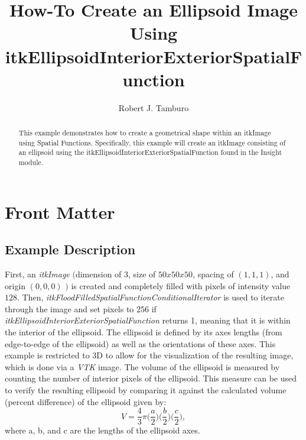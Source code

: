 \documentclass{InsightHowto}
\title{How-To Create an Ellipsoid Image Using itkEllipsoidInteriorExteriorSpatialFunction}
\author{Robert J. Tamburo}
\begin{document}
\maketitle

%


\ifhtml
\chapter*{Front Matter\label{front}}
\fi

\begin{abstract}
\noindent This example demonstrates how to create a geometrical shape within an itkImage
using Spatial Functions. Specifically, this example will create an itkImage consisting of an
ellipsoid using the itkEllipsoidInteriorExteriorSpatialFunction found in the Insight
 module.
\end{abstract}

\tableofcontents

\section{Example Description}

First, an \emph{itkImage} $\big($dimension of $3$, size of $50x50x50$, spacing of $(1,1,1)$,
and origin $(0,0,0)$ $\big)$ is created and completely filled with pixels of intensity value
$128$. Then, \emph{itkFloodFilledSpatialFunctionConditionalIterator} is used to iterate
through the image and set pixels to 256 if
\emph{itkEllipsoidInteriorExteriorSpatialFunction} returns 1, meaning that it is within the
interior of the ellipsoid. The ellipsoid is defined by its axes lengths (from edge-to-edge
of the ellipsoid) as well as the orientations of these axes. This example is restricted to
3D to allow for the visualization of the resulting image, which is done via a \emph{VTK}
image. The volume of the ellipsoid is measured by counting the number of interior pixels of
the ellipsoid. This measure can be used to verify the resulting ellipsoid by comparing it
against the calculated volume (percent difference) of the ellipsoid given by:
\begin{equation}\label{1}
  V=\frac{4}{3} \pi \Big(\frac{a}{2}\Big) \Big(\frac{b}{2}\Big) \Big(\frac{c}{2}\Big),
\end{equation}
where a, b, and c are the lengths of the ellipsoid axes.
\end{document}
